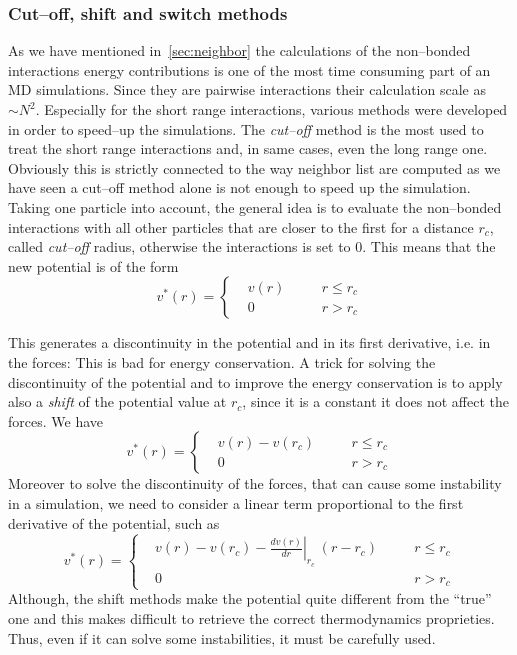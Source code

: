 \subsubsection{Cut--off, shift and switch methods}
As we have mentioned in~\ref{sec:neighbor} the calculations of the non--bonded interactions energy contributions is one of the most time consuming part of an \ac{MD} simulations. Since they are pairwise interactions their calculation scale as $\sim N^2$. Especially for the short range interactions, various methods were developed in order to speed--up the simulations. The \textit{cut--off} method is the most used to treat the short range interactions and, in same cases, even the long range one. Obviously this is strictly connected to the way neighbor list are computed as we have seen a cut--off method alone is not enough to speed up the simulation. Taking one particle into account, the general idea is to evaluate the non--bonded interactions with all other particles that are closer to the first for a distance $r_c$, called \textit{cut--off} radius, otherwise the interactions is set to $0$. This means that the new potential is of the form
\begin{equation*}
v^*(r) = \left \{
	\begin{aligned}
&v(r) & \quad & r \le r_c \\
&0    & \quad & r >   r_c
	\end{aligned} \right .
\end{equation*}

This generates a discontinuity in the potential and in its first derivative, i.e. in the forces: This is bad for energy conservation. A trick for solving the discontinuity of the potential and to improve the energy conservation is to apply also a \textit{shift} of the potential value at $r_c$, since it is a constant it does not affect the forces. We have
\begin{equation*}
v^*(r) = \left \{
	\begin{aligned}
&v(r) - v(r_c) & \quad & r \le r_c \\
&0    & \quad  & r >   r_c
	\end{aligned} \right .
\end{equation*}
Moreover to solve the discontinuity of the forces, that can cause some instability in a simulation, we need to consider a linear term proportional to the first derivative of the potential, such as
\begin{equation*}
v^*(r) = \left \{
	\begin{aligned}
&v(r) - v(r_c) - \left . \frac{dv(r)}{dr}\right |_{r_c}\ (r - r_c) & \quad & r \le r_c \\
&0    & \quad  & r >   r_c
	\end{aligned} \right .
\end{equation*}
Although, the shift methods make the potential quite different from the ``true'' one and this makes difficult to retrieve the correct thermodynamics proprieties. Thus, even if it can solve some instabilities, it must be carefully used.

